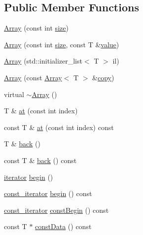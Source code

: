 \subsection*{Public Member Functions}
\begin{DoxyCompactItemize}
\item 
\hyperlink{classprism_1_1_array_aab128f1ed5a4547a04812b921dc75897}{Array} (const int \hyperlink{classprism_1_1_array_a83c88f0f351ac35798f40ed4e922e187}{size})
\item 
\hyperlink{classprism_1_1_array_ac696e19a99b7a601f013352617689098}{Array} (const int \hyperlink{classprism_1_1_array_a83c88f0f351ac35798f40ed4e922e187}{size}, const T \&\hyperlink{classprism_1_1_array_a2c5690996975510eed7112066b936d8f}{value})
\item 
\hyperlink{classprism_1_1_array_ada5fda23d2713ee3b2875495c77948b2}{Array} (std\+::initializer\+\_\+list$<$ T $>$ il)
\item 
\hyperlink{classprism_1_1_array_a15f0a0b32b4d95975fd15f0c1321d144}{Array} (const \hyperlink{classprism_1_1_array}{Array}$<$ T $>$ \&\hyperlink{namespaceprism_ae776f4cd825f79e7af1cf6ee1d90a209}{copy})
\item 
virtual \hyperlink{classprism_1_1_array_ad8787402f15054e257a7b407f07f469e}{$\sim$\+Array} ()
\item 
T \& \hyperlink{classprism_1_1_array_a669341733bb97105adcedc9a9e159dcd}{at} (const int index)
\item 
const T \& \hyperlink{classprism_1_1_array_ae88b7be661d69a754c1a9a49adb7e9b7}{at} (const int index) const 
\item 
T \& \hyperlink{classprism_1_1_array_a23345041d2c537ad6cffc7e2a3afcfe4}{back} ()
\item 
const T \& \hyperlink{classprism_1_1_array_a4efee82c9091e2656d65ea5a9a2c2fd8}{back} () const 
\item 
\hyperlink{classprism_1_1_array_a6814c2af67e8b3fc48b02319f5e63d50}{iterator} \hyperlink{classprism_1_1_array_a2458620d3d5270c7ce2cb6413b65e731}{begin} ()
\item 
\hyperlink{classprism_1_1_array_ab78c83a88959a72d59e5f930540be94a}{const\+\_\+iterator} \hyperlink{classprism_1_1_array_a37f88fd8b0776145a47e7d14b7681d28}{begin} () const 
\item 
\hyperlink{classprism_1_1_array_ab78c83a88959a72d59e5f930540be94a}{const\+\_\+iterator} \hyperlink{classprism_1_1_array_a08b8bf28cf5ee167e240792923c90415}{const\+Begin} () const 
\item 
const T $\ast$ \hyperlink{classprism_1_1_array_af6e860868e38d2779f0839e1815ea0bd}{const\+Data} () const 

\end{DoxyCompactItemize}
